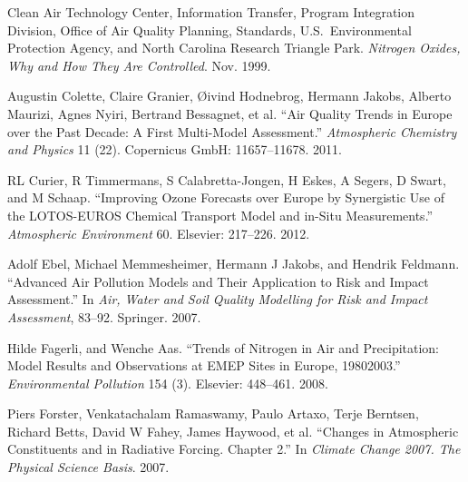 \documentclass[9pt]{report}
\begin{document}
{\begin{thebibliography}{34}
Clean Air Technology Center, Information Transfer, Program Integration Division, Office of Air Quality Planning, Standards, U.S.~Environmental Protection Agency, and North Carolina Research Triangle Park. \emph{Nitrogen Oxides, Why and How They Are Controlled}. Nov. 1999.\label{epabulletin}%

Augustin Colette, Claire Granier, \O{}ivind Hodnebrog, Hermann Jakobs, Alberto Maurizi, Agnes Nyiri, Bertrand Bessagnet, et al. \textquotedblleft{}Air Quality Trends in Europe over the Past Decade: A First Multi-Model Assessment.\textquotedblright{} \emph{Atmospheric Chemistry and Physics} 11 (22). Copernicus GmbH: 11657–11678. 2011.\label{colette2011air}%

RL Curier, R Timmermans, S Calabretta-Jongen, H Eskes, A Segers, D Swart, and M Schaap. \textquotedblleft{}Improving Ozone Forecasts over Europe by Synergistic Use of the LOTOS-EUROS Chemical Transport Model and in-Situ Measurements.\textquotedblright{} \emph{Atmospheric Environment} 60. Elsevier: 217–226. 2012.\label{curier2012improving}%

Adolf Ebel, Michael Memmesheimer, Hermann J Jakobs, and Hendrik Feldmann. \textquotedblleft{}Advanced Air Pollution Models and Their Application to Risk and Impact Assessment.\textquotedblright{} In \emph{Air, Water and Soil Quality Modelling for Risk and Impact Assessment}, 83–92. Springer. 2007.\label{ebel2007advanced}%

Hilde Fagerli, and Wenche Aas. \textquotedblleft{}Trends of Nitrogen in Air and Precipitation: Model Results and Observations at EMEP Sites in Europe, 1980\textendash{}2003.\textquotedblright{} \emph{Environmental Pollution} 154 (3). Elsevier: 448–461. 2008.\label{fagerli2008trends}%

Piers Forster, Venkatachalam Ramaswamy, Paulo Artaxo, Terje Berntsen, Richard Betts, David W Fahey, James Haywood, et al. \textquotedblleft{}Changes in Atmospheric Constituents and in Radiative Forcing. Chapter 2.\textquotedblright{} In \emph{Climate Change 2007. The Physical Science Basis}. 2007.\label{forster2007changes}%


\end{thebibliography}}
\end{document}
